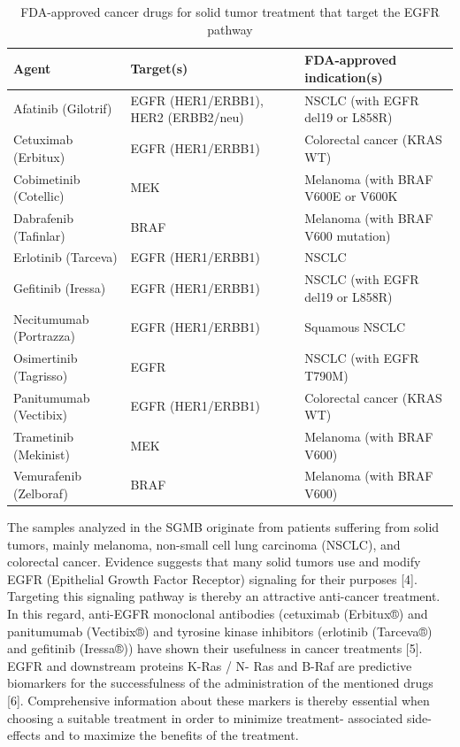 \begin{table}[!htbp]
    \caption[Targeted Cancer Agents]{FDA-approved cancer drugs for solid tumor treatment that target the EGFR pathway}
    \centering
    \begin{tabular}{ |p{4cm}|p{3.7cm}|p{6.3cm}|}
    \hline
    Agent & Target(s) & FDA-approved indication(s) \\ \hline \hline
    Afatinib (Gilotrif) & EGFR (HER1/ERBB1), HER2 (ERBB2/neu) & NSCLC (with EGFR del19 or L858R) \\
    Cetuximab (Erbitux) & EGFR (HER1/ERBB1) & Colorectal cancer (KRAS WT) \\
    Cobimetinib (Cotellic) & MEK & Melanoma (with BRAF V600E or V600K \\
    Dabrafenib (Tafinlar) & BRAF & Melanoma (with BRAF V600 mutation) \\
    Erlotinib (Tarceva) & EGFR (HER1/ERBB1) & NSCLC \\
    Gefitinib (Iressa) & EGFR (HER1/ERBB1) & NSCLC (with EGFR del19 or L858R) \\
    Necitumumab (Portrazza) & EGFR (HER1/ERBB1) & Squamous NSCLC \\
    Osimertinib (Tagrisso) & EGFR & NSCLC (with EGFR T790M) \\
    Panitumumab (Vectibix) & EGFR (HER1/ERBB1) & Colorectal cancer (KRAS WT) \\
    Trametinib (Mekinist) & MEK & Melanoma (with BRAF V600) \\
    Vemurafenib (Zelboraf) & BRAF & Melanoma (with BRAF V600) \\
    \hline
  \end{tabular}
\end{table}

The samples analyzed in the SGMB originate from patients suffering from solid
tumors, mainly melanoma, non-small cell lung carcinoma (NSCLC), and colorectal
cancer. Evidence suggests that many solid tumors use and modify EGFR (Epithelial
Growth Factor Receptor) signaling for their purposes [4]. Targeting this
signaling pathway is thereby an attractive anti-cancer treatment. In this
regard, anti-EGFR monoclonal antibodies (cetuximab (Erbitux®) and panitumumab
(Vectibix®) and tyrosine kinase inhibitors (erlotinib (Tarceva®) and gefitinib
(Iressa®)) have shown their usefulness in cancer treatments [5]. EGFR and
downstream proteins K-Ras / N- Ras and B-Raf are predictive biomarkers for the
successfulness of the administration of the mentioned drugs [6]. Comprehensive
information about these markers is thereby essential when choosing a suitable
treatment in order to minimize treatment- associated side-effects and to
maximize the benefits of the treatment.

